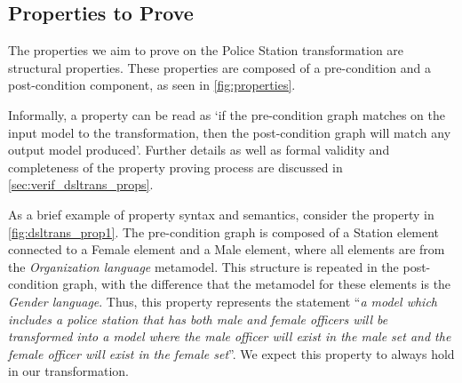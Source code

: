 
\subsection{Properties to Prove}

The properties we aim to prove on the Police Station transformation are structural properties. These properties are composed of a pre-condition and a post-condition component, as seen in \cref{fig:properties}. 

Informally, a property can be read as `if the pre-condition graph matches on the input model to the transformation, then the post-condition graph will match any output model produced'. Further details as well as formal validity and completeness of the property proving process are discussed in \cref{sec:verif_dsltrans_props}.

As a brief example of property syntax and semantics, consider the property in \cref{fig:dsltrans_prop1}. The pre-condition graph is composed of a Station element connected to a Female element and a Male element, where all elements are from the \emph{Organization language} metamodel. This structure is repeated in the post-condition graph, with the difference that the metamodel for these elements is the \emph{Gender language}. Thus, this property represents the statement ``\emph{a model which includes a
police station that has both male and female officers will be
transformed into a model where the male officer will exist in the male set
and the female officer will exist in the female set}''. We expect this property to always hold in our transformation.

